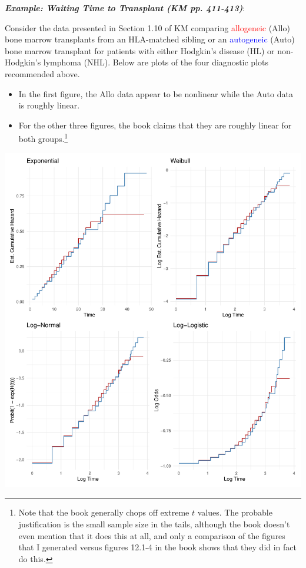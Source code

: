 \documentclass[10pt]{article}\usepackage[]{graphicx}\usepackage[]{xcolor}
\makeatletter
\def\maxwidth{ %
  \ifdim\Gin@nat@width>\linewidth
    \linewidth
  \else
    \Gin@nat@width
  \fi
}
\newenvironment{knitrout}{}{} %
\theoremstyle{definition}
\numberwithin{equation}{subsection}
\numberwithin{figure}{section}
\numberwithin{table}{subsection}
\numberwithin{Report}{section}
\numberwithin{Example}{subsection}
\makeatother
\begin{document}
\noindent\textit{\textbf{Example: Waiting Time to Transplant (KM pp. 411-413)}}: 

\noindent Consider the data presented in Section 1.10 of KM comparing \textcolor{red}{allogeneic} (Allo) bone marrow transplants from an HLA-matched sibling or an \textcolor{blue}{autogeneic} (Auto) bone marrow transplant for patients with either Hodgkin’s disease (HL) or non-Hodgkin’s lymphoma (NHL). Below are plots of the four diagnostic plots recommended above.
\begin{itemize}
	\item In the first figure, the Allo data appear to be nonlinear while the Auto data is roughly linear.
	\item For the other three figures, the book claims that they are roughly linear for both groups.\footnote{Note that the book generally chops off extreme $t$ values. The probable justification is the small sample size in the tails, although the book doesn't even mention that it does this at all, and only a comparison of the figures that I generated versus figures 12.1-4 in the book shows that they did in fact do this.}
\end{itemize}

\newpage


\begin{knitrout}
\color{fgcolor}

{\centering \includegraphics[width=\maxwidth]{figure/unnamed-chunk-1-1} 

}


\end{knitrout}
\end{document}
